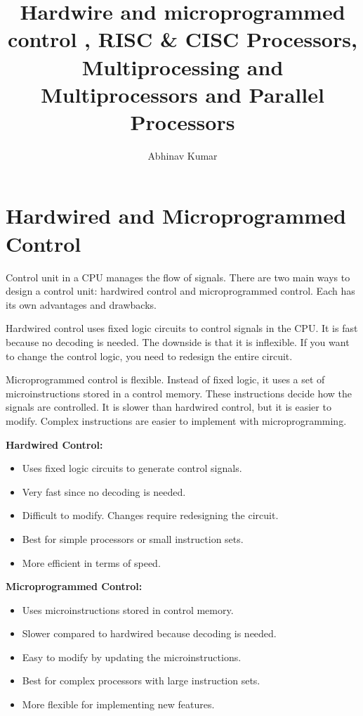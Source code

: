 \documentclass[12pt]{article}
\title{Hardwire and microprogrammed control , RISC & CISC Processors, Multiprocessing and Multiprocessors and Parallel Processors}
\author{Abhinav Kumar}
\begin{document}
\maketitle
\newpage
\section*{Hardwired and Microprogrammed Control}
Control unit in a CPU manages the flow of signals. There are two main ways to design a control unit: hardwired control and microprogrammed control. Each has its own advantages and drawbacks. 

Hardwired control uses fixed logic circuits to control signals in the CPU. It is fast because no decoding is needed. The downside is that it is inflexible. If you want to change the control logic, you need to redesign the entire circuit.

Microprogrammed control is flexible. Instead of fixed logic, it uses a set of microinstructions stored in a control memory. These instructions decide how the signals are controlled. It is slower than hardwired control, but it is easier to modify. Complex instructions are easier to implement with microprogramming.


\begin{multicols}{2}
    \textbf{Hardwired Control:}
    \begin{itemize}
        \item Uses fixed logic circuits to generate control signals.
        \item Very fast since no decoding is needed.
        \item Difficult to modify. Changes require redesigning the circuit.
        \item Best for simple processors or small instruction sets.
        \item More efficient in terms of speed.
    \end{itemize}
    
    \columnbreak
    
    \textbf{Microprogrammed Control:}
    \begin{itemize}
        \item Uses microinstructions stored in control memory.
        \item Slower compared to hardwired because decoding is needed.
        \item Easy to modify by updating the microinstructions.
        \item Best for complex processors with large instruction sets.
        \item More flexible for implementing new features.
    \end{itemize}
\end{multicols}
\newpage
\end{document}
